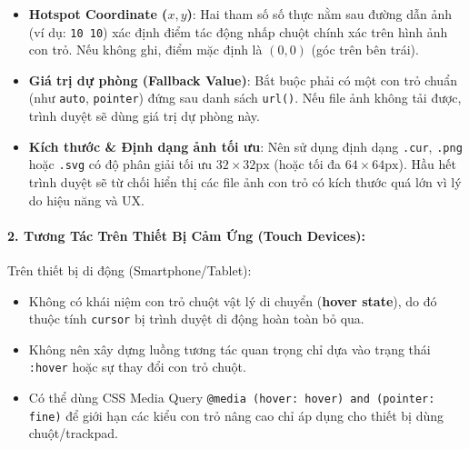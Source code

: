 \documentclass[11pt,oneside]{book}
\newcommand{\codeinline}[1]{\textcolor{accentOrange}{\texttt{#1}}}
\newcommand{\term}[1]{\textbf{\textcolor{primaryBlue}{#1}}}
\begin{document}
\begin{itemize}[leftmargin=1.5em, itemsep=3pt, parsep=0pt]
    \item \textbf{Hotspot Coordinate ($x, y$)}: Hai tham số số thực nằm sau đường dẫn ảnh (ví dụ: \codeinline{10 10}) xác định điểm tác động nhấp chuột chính xác trên hình ảnh con trỏ. Nếu không ghi, điểm mặc định là $(0, 0)$ (góc trên bên trái).
    \item \textbf{Giá trị dự phòng (\term{Fallback Value})}: Bắt buộc phải có một con trỏ chuẩn (như \codeinline{auto}, \codeinline{pointer}) đứng sau danh sách \codeinline{url()}. Nếu file ảnh không tải được, trình duyệt sẽ dùng giá trị dự phòng này.
    \item \textbf{Kích thước \& Định dạng ảnh tối ưu}: Nên sử dụng định dạng \codeinline{.cur}, \codeinline{.png} hoặc \codeinline{.svg} có độ phân giải tối ưu $32 \times 32\text{px}$ (hoặc tối đa $64 \times 64\text{px}$). Hầu hết trình duyệt sẽ từ chối hiển thị các file ảnh con trỏ có kích thước quá lớn vì lý do hiệu năng và UX.
\end{itemize}

\paragraph{2. Tương Tác Trên Thiết Bị Cảm Ứng (Touch Devices):}
Trên thiết bị di động (Smartphone/Tablet):
\begin{itemize}[leftmargin=1.5em, itemsep=3pt, parsep=0pt]
    \item Không có khái niệm con trỏ chuột vật lý di chuyển (\term{hover state}), do đó thuộc tính \codeinline{cursor} bị trình duyệt di động hoàn toàn bỏ qua.
    \item Không nên xây dựng luồng tương tác quan trọng chỉ dựa vào trạng thái \codeinline{:hover} hoặc sự thay đổi con trỏ chuột.
    \item Có thể dùng CSS Media Query \codeinline{@media (hover: hover) and (pointer: fine)} để giới hạn các kiểu con trỏ nâng cao chỉ áp dụng cho thiết bị dùng chuột/trackpad.
\end{itemize}
\end{document}
